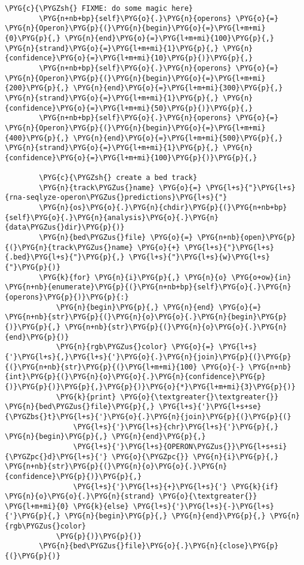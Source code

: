 \begin{Verbatim}[commandchars=\\\{\}]
        \PYG{c}{\PYGZsh{} FIXME: do some magic here}
        \PYG{n+nb+bp}{self}\PYG{o}{.}\PYG{n}{operons} \PYG{o}{=} \PYG{n}{Operon}\PYG{p}{(}\PYG{n}{begin}\PYG{o}{=}\PYG{l+m+mi}{0}\PYG{p}{,} \PYG{n}{end}\PYG{o}{=}\PYG{l+m+mi}{100}\PYG{p}{,} \PYG{n}{strand}\PYG{o}{=}\PYG{l+m+mi}{1}\PYG{p}{,} \PYG{n}{confidence}\PYG{o}{=}\PYG{l+m+mi}{10}\PYG{p}{)}\PYG{p}{,}
        \PYG{n+nb+bp}{self}\PYG{o}{.}\PYG{n}{operons} \PYG{o}{=} \PYG{n}{Operon}\PYG{p}{(}\PYG{n}{begin}\PYG{o}{=}\PYG{l+m+mi}{200}\PYG{p}{,} \PYG{n}{end}\PYG{o}{=}\PYG{l+m+mi}{300}\PYG{p}{,} \PYG{n}{strand}\PYG{o}{=}\PYG{l+m+mi}{1}\PYG{p}{,} \PYG{n}{confidence}\PYG{o}{=}\PYG{l+m+mi}{50}\PYG{p}{)}\PYG{p}{,}
        \PYG{n+nb+bp}{self}\PYG{o}{.}\PYG{n}{operons} \PYG{o}{=} \PYG{n}{Operon}\PYG{p}{(}\PYG{n}{begin}\PYG{o}{=}\PYG{l+m+mi}{400}\PYG{p}{,} \PYG{n}{end}\PYG{o}{=}\PYG{l+m+mi}{500}\PYG{p}{,} \PYG{n}{strand}\PYG{o}{=}\PYG{l+m+mi}{1}\PYG{p}{,} \PYG{n}{confidence}\PYG{o}{=}\PYG{l+m+mi}{100}\PYG{p}{)}\PYG{p}{,}

        \PYG{c}{\PYGZsh{} create a bed track}
        \PYG{n}{track\PYGZus{}name} \PYG{o}{=} \PYG{l+s}{"}\PYG{l+s}{rna-seqlyze-operon\PYGZus{}predictions}\PYG{l+s}{"}
        \PYG{n}{os}\PYG{o}{.}\PYG{n}{chdir}\PYG{p}{(}\PYG{n+nb+bp}{self}\PYG{o}{.}\PYG{n}{analysis}\PYG{o}{.}\PYG{n}{data\PYGZus{}dir}\PYG{p}{)}
        \PYG{n}{bed\PYGZus{}file} \PYG{o}{=} \PYG{n+nb}{open}\PYG{p}{(}\PYG{n}{track\PYGZus{}name} \PYG{o}{+} \PYG{l+s}{"}\PYG{l+s}{.bed}\PYG{l+s}{"}\PYG{p}{,} \PYG{l+s}{"}\PYG{l+s}{w}\PYG{l+s}{"}\PYG{p}{)}
        \PYG{k}{for} \PYG{n}{i}\PYG{p}{,} \PYG{n}{o} \PYG{o+ow}{in} \PYG{n+nb}{enumerate}\PYG{p}{(}\PYG{n+nb+bp}{self}\PYG{o}{.}\PYG{n}{operons}\PYG{p}{)}\PYG{p}{:}
            \PYG{n}{begin}\PYG{p}{,} \PYG{n}{end} \PYG{o}{=} \PYG{n+nb}{str}\PYG{p}{(}\PYG{n}{o}\PYG{o}{.}\PYG{n}{begin}\PYG{p}{)}\PYG{p}{,} \PYG{n+nb}{str}\PYG{p}{(}\PYG{n}{o}\PYG{o}{.}\PYG{n}{end}\PYG{p}{)}
            \PYG{n}{rgb\PYGZus{}color} \PYG{o}{=} \PYG{l+s}{'}\PYG{l+s}{,}\PYG{l+s}{'}\PYG{o}{.}\PYG{n}{join}\PYG{p}{(}\PYG{p}{(}\PYG{n+nb}{str}\PYG{p}{(}\PYG{l+m+mi}{100} \PYG{o}{-} \PYG{n+nb}{int}\PYG{p}{(}\PYG{n}{o}\PYG{o}{.}\PYG{n}{confidence}\PYG{p}{)}\PYG{p}{)}\PYG{p}{,}\PYG{p}{)}\PYG{o}{*}\PYG{l+m+mi}{3}\PYG{p}{)}
            \PYG{k}{print} \PYG{o}{\textgreater{}\textgreater{}} \PYG{n}{bed\PYGZus{}file}\PYG{p}{,} \PYG{l+s}{'}\PYG{l+s+se}{\PYGZbs{}t}\PYG{l+s}{'}\PYG{o}{.}\PYG{n}{join}\PYG{p}{(}\PYG{p}{(}
                \PYG{l+s}{'}\PYG{l+s}{chr}\PYG{l+s}{'}\PYG{p}{,} \PYG{n}{begin}\PYG{p}{,} \PYG{n}{end}\PYG{p}{,}
                \PYG{l+s}{'}\PYG{l+s}{OPERON\PYGZus{}}\PYG{l+s+si}{\PYGZpc{}d}\PYG{l+s}{'} \PYG{o}{\PYGZpc{}} \PYG{n}{i}\PYG{p}{,} \PYG{n+nb}{str}\PYG{p}{(}\PYG{n}{o}\PYG{o}{.}\PYG{n}{confidence}\PYG{p}{)}\PYG{p}{,}
                \PYG{l+s}{'}\PYG{l+s}{+}\PYG{l+s}{'} \PYG{k}{if} \PYG{n}{o}\PYG{o}{.}\PYG{n}{strand} \PYG{o}{\textgreater{}} \PYG{l+m+mi}{0} \PYG{k}{else} \PYG{l+s}{'}\PYG{l+s}{-}\PYG{l+s}{'}\PYG{p}{,} \PYG{n}{begin}\PYG{p}{,} \PYG{n}{end}\PYG{p}{,} \PYG{n}{rgb\PYGZus{}color}
            \PYG{p}{)}\PYG{p}{)}
        \PYG{n}{bed\PYGZus{}file}\PYG{o}{.}\PYG{n}{close}\PYG{p}{(}\PYG{p}{)}


\end{Verbatim}
